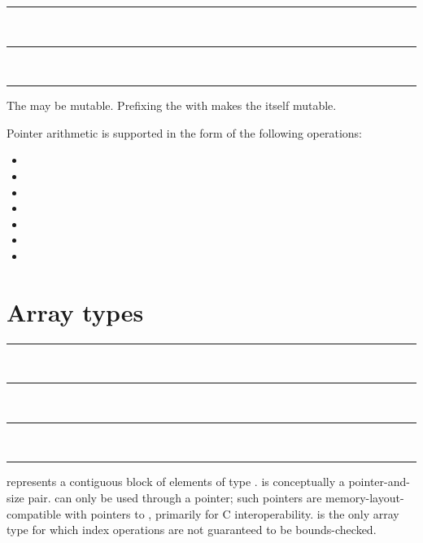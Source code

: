 \begin{grammar}
\rule{pointer-type}  \code{*}\\
\rule{pointer-type}   \code{*}\\
\rule{pointee-type} 
\end{grammar}

The  may be mutable. Prefixing the \code{*} with
 makes the  itself mutable.

\begin{samepage}
Pointer arithmetic is supported in the form of the following operations:

\begin{itemize}
\item {} \code{+} 
\item {} \code{+=} 
\item {} \code{++}
\item {} \code{-} 
\item {} \code{-=} 
\item {} \code{--}
\item {} \code{-} 
\end{itemize}
\end{samepage}

\section{Array types}

\begin{grammar}
\rule{array-type-with-constant-size}  \code{[}  \code{]}\\
\rule{array-type-with-runtime-size}  \code{[} \code{]}\\
\rule{array-type-with-unknown-size}  \code{[}  \code{]}\\
\rule{element-type} 
\end{grammar}

 represents a contiguous block of
 elements of type .
 is conceptually a pointer-and-size
pair.  can only be used through a
pointer; such pointers are memory-layout-compatible with pointers to
, primarily for C interoperability.
 is the only array type for which
index operations are not guaranteed to be bounds-checked.


